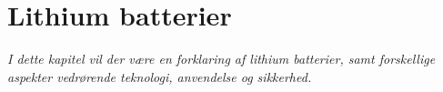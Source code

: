 \chapter{Lithium batterier}\label{kap:lithium}

\emph{I dette kapitel vil der være en forklaring af lithium batterier, samt forskellige aspekter vedrørende teknologi, anvendelse og sikkerhed.}